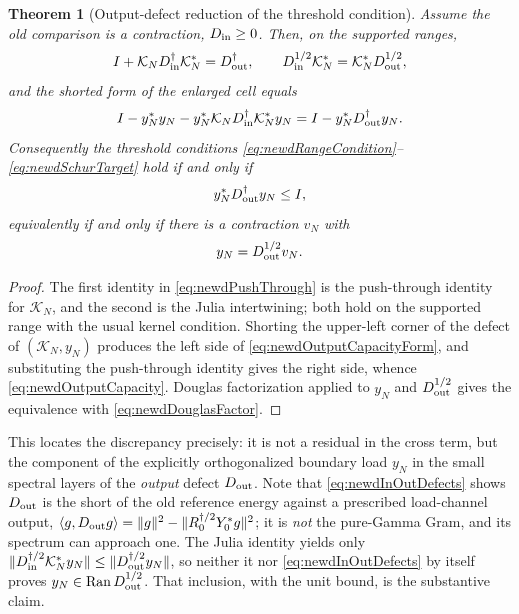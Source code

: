\documentclass[11pt]{amsart}
\newtheorem{theorem}{Theorem}[section]
\theoremstyle{definition}
\theoremstyle{remark}
\begin{document}
\begin{theorem}[Output-defect reduction of the threshold condition]
\label{thm:newdOutputDefect}
Assume the old comparison is a contraction, \(D_{\rm in}\ge0\).  Then, on the
supported ranges,
\begin{equation}\label{eq:newdPushThrough}
 I+\mathcal K_ND_{\rm in}^\dagger\mathcal K_N^*=D_{\rm out}^\dagger,
 \qquad
 D_{\rm in}^{1/2}\mathcal K_N^*=\mathcal K_N^*D_{\rm out}^{1/2},
\end{equation}
and the shorted form of the enlarged cell equals
\begin{equation}\label{eq:newdOutputCapacityForm}
 I-y_N^*y_N-y_N^*\mathcal K_ND_{\rm in}^\dagger\mathcal K_N^*y_N
 =I-y_N^*D_{\rm out}^\dagger y_N .
\end{equation}
Consequently the threshold conditions
\eqref{eq:newdRangeCondition}--\eqref{eq:newdSchurTarget} hold if and only if
\begin{equation}\label{eq:newdOutputCapacity}
 y_N^*D_{\rm out}^\dagger y_N\le I,
\end{equation}
equivalently if and only if there is a contraction \(v_N\) with
\begin{equation}\label{eq:newdDouglasFactor}
 y_N=D_{\rm out}^{1/2}v_N .
\end{equation}
\end{theorem}

\begin{proof}
The first identity in \eqref{eq:newdPushThrough} is the push-through identity
for \(\mathcal K_N\), and the second is the Julia intertwining; both hold on
the supported range with the usual kernel condition.  Shorting the upper-left
corner of the defect of \((\mathcal K_N,y_N)\) produces the left side of
\eqref{eq:newdOutputCapacityForm}, and substituting the push-through identity
gives the right side, whence \eqref{eq:newdOutputCapacity}.  Douglas
factorization applied to \(y_N\) and \(D_{\rm out}^{1/2}\) gives the
equivalence with \eqref{eq:newdDouglasFactor}.
\end{proof}

This locates the discrepancy precisely: it is not a residual in the cross
term, but the component of the explicitly orthogonalized boundary load
\(y_N\) in the small spectral layers of the \emph{output} defect
\(D_{\rm out}\).  Note that \eqref{eq:newdInOutDefects} shows
\(D_{\rm out}\) is the short of the old reference energy against a prescribed
load-channel output, \(\langle g,D_{\rm out}g\rangle
 =\|g\|^2-\|R_0^{\dagger/2}Y_0^*g\|^2\); it is \emph{not} the pure-Gamma
Gram, and its spectrum can approach one.  The Julia identity yields only
\(\|D_{\rm in}^{\dagger/2}\mathcal K_N^*y_N\|
 \le\|D_{\rm out}^{\dagger/2}y_N\|\), so neither it nor
\eqref{eq:newdInOutDefects} by itself proves
\(y_N\in\operatorname{Ran}D_{\rm out}^{1/2}\).  That inclusion, with the unit
bound, is the substantive claim.
\end{document}
